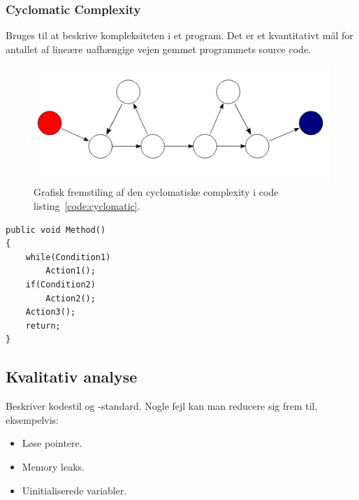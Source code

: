 \subsubsection{Cyclomatic Complexity}\label{sec:cyclomatic}
Bruges til at beskrive kompleksiteten i et program. Det er et kvantitativt mål for antallet af lineære uafhængige vejen gemmet programmets source code.

%
%
%
%

\begin{figure}[H]
	\centering
	\includegraphics[width=0.8\linewidth]{figs/cyclomatic}
	\caption{Grafisk fremstiling af den cyclomatiske complexity i code listing~\ref{code:cyclomatic}.}
	\label{fig:cyclomatic}
\end{figure}

\begin{lstlisting}[caption=Kode for eksempel vist på figur~\ref{fig:cyclomatic}.,label=code:cyclomatic]
public void Method()
{
	while(Condition1) 
		Action1();		
	if(Condition2) 
		Action2();		
	Action3();	
	return;
}
\end{lstlisting}

\subsection{Kvalitativ analyse}
Beskriver kodestil og -standard. Nogle fejl kan man reducere sig frem til, eksempelvis: 

\begin{itemize}
	\item Løse pointere.
	\item Memory leaks.
	\item Uinitialiserede variabler.
\end{itemize}

